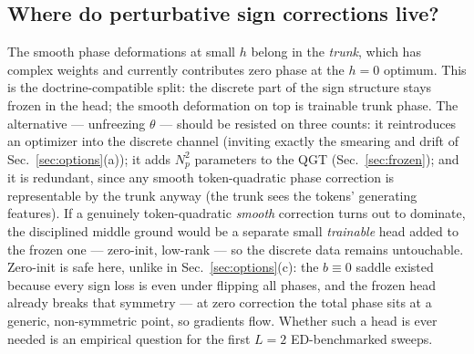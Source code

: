 \documentclass[11pt]{article}
\begin{document}
\subsection{Where do perturbative sign corrections live?}
The smooth phase deformations at small $h$ belong in the \emph{trunk}, which
has complex weights and currently contributes zero phase at the $h=0$
optimum. This is the doctrine-compatible split: the discrete part of the
sign structure stays frozen in the head; the smooth deformation on top is
trainable trunk phase. The alternative --- unfreezing $\theta$ --- should be
resisted on three counts: it reintroduces an optimizer into the discrete
channel (inviting exactly the smearing and drift of
Sec.~\ref{sec:options}(a)); it adds $N_p^2$ parameters to the QGT
(Sec.~\ref{sec:frozen}); and it is redundant, since any smooth token-quadratic
phase correction is representable by the trunk anyway (the trunk sees the
tokens' generating features). If a genuinely token-quadratic \emph{smooth}
correction turns out to dominate, the disciplined middle ground would be a
separate small \emph{trainable} head added to the frozen one --- zero-init,
low-rank --- so the discrete data remains untouchable. Zero-init is safe
here, unlike in Sec.~\ref{sec:options}(c): the $b\equiv0$ saddle existed
because every sign loss is even under flipping all phases, and the frozen
head already breaks that symmetry --- at zero correction the total phase
sits at a generic, non-symmetric point, so gradients flow. Whether such a
head is ever needed is an empirical question for the first $L=2$
ED-benchmarked sweeps.
\end{document}
